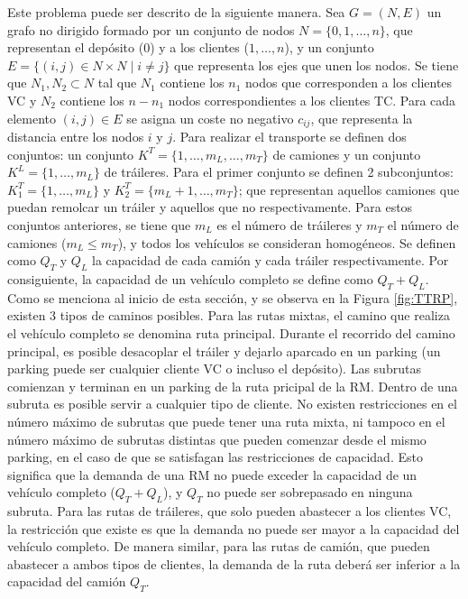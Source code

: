Este problema puede ser descrito de la siguiente manera. Sea $G=(N,E)$ un grafo no dirigido formado por un conjunto de nodos $N=\{0,1,\ldots,n\}$, que representan el depósito ($0$) y a los clientes ($1,\ldots,n$), y un conjunto $E=\{(i,j)\in N\times N\;|\;i\neq j\}$ que representa los ejes que unen los nodos. Se tiene que $N_1, N_2\subset N$ tal que $N_1$ contiene los $n_1$ nodos que corresponden a los clientes VC y $N_2$ contiene los $n-n_1$ nodos correspondientes a los clientes TC. Para cada elemento $(i,j)\in E$ se asigna un coste no negativo $c_{ij}$, que representa la distancia entre los nodos $i$ y $j$. Para realizar el transporte se definen dos conjuntos: un conjunto $K^T=\{1,\ldots,m_L,\ldots,m_T\}$ de camiones y un conjunto $K^L=\{1,\ldots,m_L\}$ de tráileres. Para el primer conjunto se definen 2 subconjuntos: $K^T_1=\{1,\ldots,m_L\}$ y $K_2^T=\{m_L+1,\ldots,m_T\}$; que representan aquellos camiones que puedan remolcar un tráiler y aquellos que no respectivamente. Para estos conjuntos anteriores, se tiene que $m_L$ es el número de tráileres y $m_T$ el número de camiones ($m_L\leq m_T$), y todos los vehículos se consideran homogéneos. Se definen como $Q_T$ y $Q_L$ la capacidad de cada camión y cada tráiler respectivamente. Por consiguiente, la capacidad de un vehículo completo se define como $Q_T+Q_L$.\\

Como se menciona al inicio de esta sección, y se observa en la Figura \ref{fig:TTRP}, existen 3 tipos de caminos posibles. Para las rutas mixtas, el camino que realiza el vehículo completo se denomina ruta principal. Durante el recorrido del camino principal, es posible desacoplar el tráiler y dejarlo aparcado en un parking (un parking puede ser cualquier cliente VC o incluso el depósito). Las subrutas comienzan y terminan en un parking de la ruta pricipal de la RM. Dentro de una subruta es posible servir a cualquier tipo de cliente. No existen restricciones en el número máximo de subrutas que puede tener una ruta mixta, ni tampoco en el número máximo de subrutas distintas que pueden comenzar desde el mismo parking, en el caso de que se satisfagan las restricciones de capacidad. Esto significa que la demanda de una RM no puede exceder la capacidad de un vehículo completo ($Q_T+Q_L$), y $Q_T$ no puede ser sobrepasado en ninguna subruta. Para las rutas de tráileres, que solo pueden abastecer a los clientes VC, la restricción que existe es que la demanda no puede ser mayor a la capacidad del vehículo completo. De manera similar, para las rutas de camión, que pueden abastecer a ambos tipos de clientes, la demanda de la ruta deberá ser inferior a la capacidad del camión $Q_T$.\\

